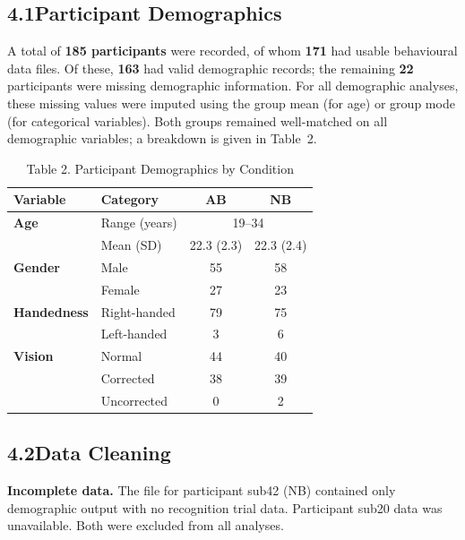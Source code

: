 \documentclass[11pt]{article}
\begin{document}
\subsection*{4.1\quad Participant Demographics}

A total of \textbf{185 participants} were recorded, of whom \textbf{171} had usable behavioural data files. Of these, \textbf{163} had valid demographic records; the remaining \textbf{22} participants were missing demographic information. For all demographic analyses, these missing values were imputed using the group mean (for age) or group mode (for categorical variables). Both groups remained well-matched on all demographic variables; a breakdown is given in Table~2.

\begin{table}[H]
\centering
\small
\caption*{Table 2.\; Participant Demographics by Condition}
\begin{tabular}{@{} l l c c @{}}
\toprule
\textbf{Variable}   & \textbf{Category} & \textbf{AB} & \textbf{NB} \\
\midrule
\textbf{Age}        & Range (years)     & \multicolumn{2}{c}{19--34} \\
                    & Mean (SD)         & 22.3 (2.3) & 22.3 (2.4) \\
\midrule
\textbf{Gender}     & Male              & 55 & 58 \\
                    & Female            & 27 & 23 \\
\midrule
\textbf{Handedness} & Right-handed      & 79 & 75 \\
                    & Left-handed       &  3 &  6 \\
\midrule
\textbf{Vision}     & Normal            & 44 & 40 \\
                    & Corrected         & 38 & 39 \\
                    & Uncorrected       &  0 &  2 \\
\bottomrule
\end{tabular}
\end{table}

\subsection*{4.2\quad Data Cleaning}

\textbf{Incomplete data.}\; The file for participant sub42 (NB) contained only demographic output with no recognition trial data. Participant sub20 data was unavailable. Both were excluded from all analyses.
\end{document}
